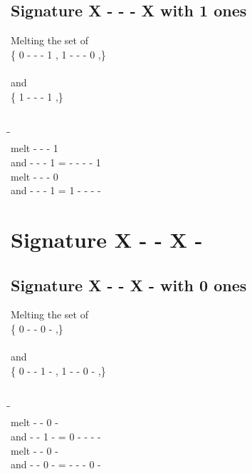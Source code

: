 \documentclass{article}
\begin{document}
\subsection{Signature X - - - X with 1 ones}
Melting the set of\\
\{ 0  -  -  -  1 , 1  -  -  -  0 ,\}\\\\
and\\
\{ 1  -  -  -  1 ,\}\\\\
\begin{tabbing}
\hspace{3cm}\=\hspace{3cm}\=\hspace{3cm}\\[1cm]
melt  -  -  -  1 \\
and  -  -  -  1 \>
 =  -  -  -  -  1 \\[1mm]
melt  -  -  -  0 \\
and  -  -  -  1 \>
 =  1  -  -  -  - \\[1mm]
\end{tabbing}
\newpage
\section{Signature X - - X - }
\subsection{Signature X - - X - with 0 ones}
Melting the set of\\
\{ 0  -  -  0  - ,\}\\\\
and\\
\{ 0  -  -  1  - , 1  -  -  0  - ,\}\\\\
\begin{tabbing}
\hspace{3cm}\=\hspace{3cm}\=\hspace{3cm}\\[1cm]
melt  -  -  0  - \\
and  -  -  1  - \>
 =  0  -  -  -  - \\[1mm]
melt  -  -  0  - \\
and  -  -  0  - \>
 =  -  -  -  0  - \\[1mm]
\end{tabbing}
\newpage
\end{document}
